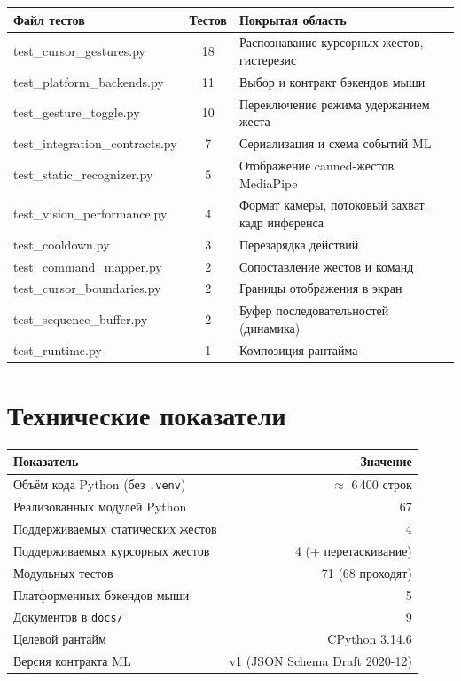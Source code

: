 \documentclass[11pt,a4paper]{article}
\begin{document}
\begin{center}
\begin{tabular}{>{\ttfamily}l c l}
\toprule
\normalfont\textbf{Файл тестов} & \textbf{Тестов} & \textbf{Покрытая область} \\
\midrule
test\_cursor\_gestures.py      & 18 & Распознавание курсорных жестов, гистерезис \\
test\_platform\_backends.py    & 11 & Выбор и контракт бэкендов мыши \\
test\_gesture\_toggle.py       & 10 & Переключение режима удержанием жеста \\
test\_integration\_contracts.py & 7 & Сериализация и схема событий ML \\
test\_static\_recognizer.py    & 5  & Отображение canned-жестов MediaPipe \\
test\_vision\_performance.py   & 4  & Формат камеры, потоковый захват, кадр инференса \\
test\_cooldown.py             & 3  & Перезарядка действий \\
test\_command\_mapper.py       & 2  & Сопоставление жестов и команд \\
test\_cursor\_boundaries.py    & 2  & Границы отображения в экран \\
test\_sequence\_buffer.py      & 2  & Буфер последовательностей (динамика) \\
test\_runtime.py              & 1  & Композиция рантайма \\
\bottomrule
\end{tabular}
\end{center}

\section{Технические показатели}

\begin{center}
\begin{tabular}{l r}
\toprule
\textbf{Показатель} & \textbf{Значение} \\
\midrule
Объём кода Python (без \texttt{.venv}) & $\approx$ 6\,400 строк \\
Реализованных модулей Python & 67 \\
Поддерживаемых статических жестов & 4 \\
Поддерживаемых курсорных жестов & 4 (+ перетаскивание) \\
Модульных тестов & 71 (68 проходят) \\
Платформенных бэкендов мыши & 5 \\
Документов в \texttt{docs/} & 9 \\
Целевой рантайм & CPython 3.14.6 \\
Версия контракта ML & v1 (JSON Schema Draft 2020-12) \\
\bottomrule
\end{tabular}
\end{center}
\end{document}
